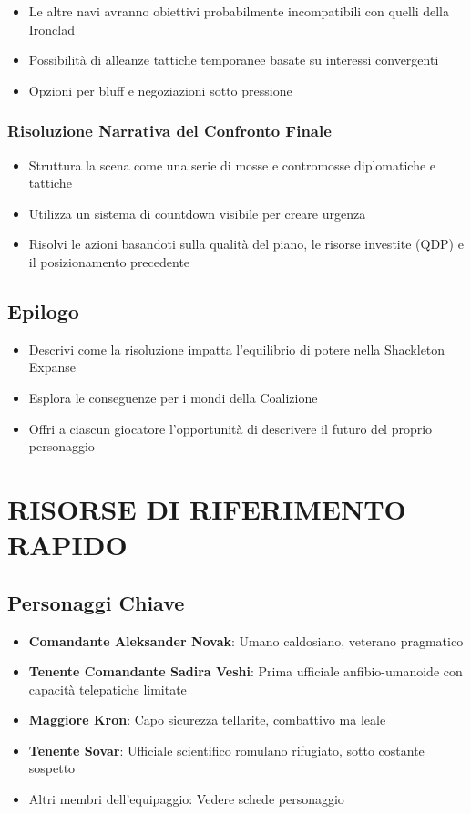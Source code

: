 \documentclass[letterpaper,twocolumn,openany,nodeprecatedcode]{dndbook}
\begin{document}
\begin{itemize}
    \item Le altre navi avranno obiettivi probabilmente incompatibili con quelli della Ironclad
    \item Possibilità di alleanze tattiche temporanee basate su interessi convergenti
    \item Opzioni per bluff e negoziazioni sotto pressione
\end{itemize}

\subsubsection{Risoluzione Narrativa del Confronto Finale}

\begin{itemize}
    \item Struttura la scena come una serie di mosse e contromosse diplomatiche e tattiche
    \item Utilizza un sistema di countdown visibile per creare urgenza
    \item Risolvi le azioni basandoti sulla qualità del piano, le risorse investite (QDP) e il posizionamento precedente
\end{itemize}

\subsection{Epilogo}

\begin{itemize}
    \item Descrivi come la risoluzione impatta l'equilibrio di potere nella Shackleton Expanse
    \item Esplora le conseguenze per i mondi della Coalizione
    \item Offri a ciascun giocatore l'opportunità di descrivere il futuro del proprio personaggio
\end{itemize}

\section{RISORSE DI RIFERIMENTO RAPIDO}
\subsection{Personaggi Chiave}

\begin{itemize}
    \item \textbf{Comandante Aleksander Novak}: Umano caldosiano, veterano pragmatico
    \item \textbf{Tenente Comandante Sadira Veshi}: Prima ufficiale anfibio-umanoide con capacità telepatiche limitate
    \item \textbf{Maggiore Kron}: Capo sicurezza tellarite, combattivo ma leale
    \item \textbf{Tenente Sovar}: Ufficiale scientifico romulano rifugiato, sotto costante sospetto
    \item Altri membri dell'equipaggio: Vedere schede personaggio
\end{itemize}
\end{document}
